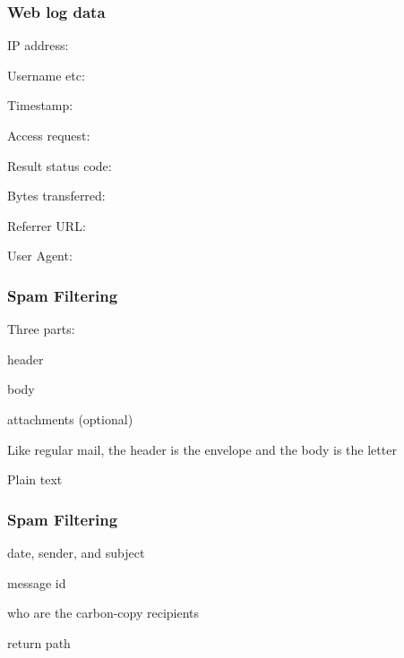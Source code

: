 \documentclass[12pt]{beamer}\usepackage[]{graphicx}\usepackage[]{color}
\begin{document}

\begin{frame}
\frametitle{Web log data}

\bi
  \item IP address: {\hilit {}}
  \item Username etc: {\hilit {}}
  \item Timestamp: {\hilit {}}
  \item Access request: \\ 
  {\hilit {}}
  \item Result status code: {\hilit {}}
  \item Bytes transferred: {\hilit {}}
  \item Referrer URL: \\ {\hilit \footnotesize {}}
  \item User Agent: {\hilit {}}
\ei

\end{frame}


\begin{frame}
\frametitle{Spam Filtering}

\bi
  \item Three parts:
  \bi
    \item header
    \item body
    \item attachments (optional)
  \ei
  \item Like regular mail, the header is the envelope and the body is the letter
  \item Plain text
\ei
\eb

\end{frame}


\begin{frame}
\frametitle{Spam Filtering}

\bi
  \item date, sender, and subject
  \item message id
  \item who are the carbon-copy recipients
  \item return path
\ei
\eb

\end{frame}
\end{document}
